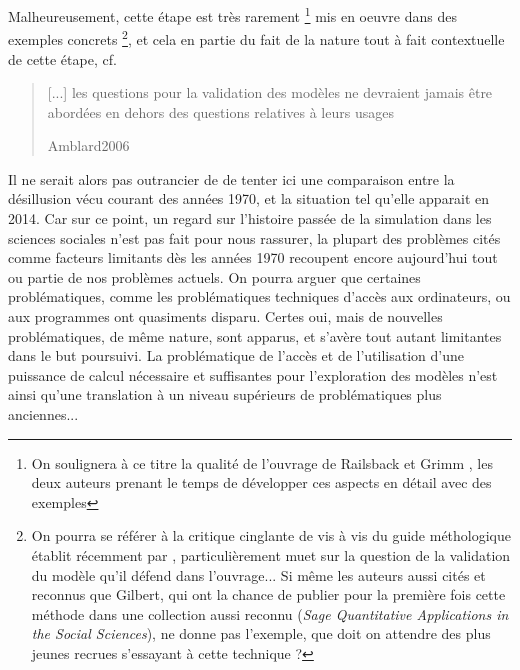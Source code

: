 Malheureusement, cette étape est très rarement \footnote{On soulignera à ce titre la qualité de l'ouvrage de Railsback et Grimm \autocite{Railsback2012}, les deux auteurs prenant le temps de développer ces aspects en détail avec des exemples} mis en oeuvre dans des exemples concrets \footnote{On pourra se référer à la critique cinglante de \autocite{Manzo2007a} vis à vis du guide méthologique établit récemment par \autocite{Gilbert2008}, particulièrement muet sur la question de la validation du modèle qu'il défend dans l'ouvrage... Si même les auteurs aussi cités et reconnus que Gilbert, qui ont la chance de publier pour la première fois cette méthode dans une collection aussi reconnu (\textit{Sage Quantitative Applications in the Social Sciences}), ne donne pas l'exemple, que doit on attendre des plus jeunes recrues s'essayant à cette technique ?}, et cela en partie du fait de la nature tout à fait contextuelle de cette étape, cf.\blockquote[Amblard2006]{[...] les questions pour  la validation des modèles ne devraient jamais être abordées en dehors des questions relatives à leurs usages}

Il ne serait alors pas outrancier de de tenter ici une comparaison entre la désillusion vécu courant des années 1970, et la situation tel qu'elle apparait en 2014. Car sur ce point, un regard sur l'histoire passée de la simulation dans les sciences sociales n'est pas fait pour nous rassurer, la plupart des problèmes cités comme facteurs limitants dès les années 1970 recoupent encore aujourd'hui tout ou partie de nos problèmes actuels. On pourra arguer que certaines problématiques, comme les problématiques techniques d'accès aux ordinateurs, ou aux programmes ont quasiments disparu. Certes oui, mais de nouvelles problématiques, de même nature, sont apparus, et s'avère tout autant limitantes dans le but poursuivi. La problématique de l'accès et de l'utilisation d'une puissance de calcul nécessaire et suffisantes pour l'exploration des modèles n'est ainsi qu'une translation à un niveau supérieurs de problématiques plus anciennes...


